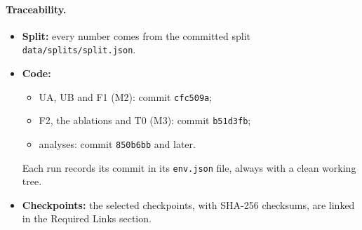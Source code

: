 \paragraph{Traceability.}
\begin{itemize}
  \item \textbf{Split:} every number comes from the committed split \texttt{data/splits/split.json}.
  \item \textbf{Code:}
        \begin{itemize}
          \item UA, UB and F1 (M2): commit \texttt{cfc509a};
          \item F2, the ablations and T0 (M3): commit \texttt{b51d3fb};
          \item analyses: commit \texttt{850b6bb} and later.
        \end{itemize}
        Each run records its commit in its \texttt{env.json} file, always with a clean working tree.
  \item \textbf{Checkpoints:} the selected checkpoints, with SHA-256 checksums, are linked in the Required Links
        section.
\end{itemize}
